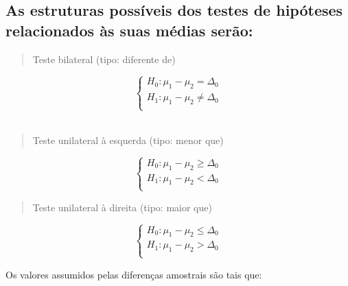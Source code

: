 \documentclass[
]{book}
\begin{document}
\hfill\break

\hypertarget{as-estruturas-possuxedveis-dos-testes-de-hipuxf3teses-relacionados-uxe0s-suas-muxe9dias-seruxe3o}{%
\subsection{As estruturas possíveis dos testes de hipóteses relacionados às suas médias serão:}\label{as-estruturas-possuxedveis-dos-testes-de-hipuxf3teses-relacionados-uxe0s-suas-muxe9dias-seruxe3o}}

\hfill\break

\begin{quote}
Teste bilateral (tipo: diferente de)
\end{quote}

\hfill\break

\[
\begin{cases}
    H_{0}:\mu_{1} - \mu_{2} = \Delta_{0} \\
    H_{1}:\mu_{1} - \mu_{2} \ne \Delta_{0} \\
\end{cases}
\]\\

\begin{quote}
Teste unilateral à esquerda (tipo: menor que)
\end{quote}

\hfill\break

\[
\begin{cases}
    H_{0}:\mu_{1} - \mu_{2} \ge \Delta_{0}\\
    H_{1}: \mu_{1} - \mu_{2} < \Delta_{0}\\
\end{cases}
\]

\hfill\break

\begin{quote}
Teste unilateral à direita (tipo: maior que)
\end{quote}

\hfill\break

\[
\begin{cases}
    H_{0}:\mu_{1} - \mu_{2} \le \Delta_{0}\\
    H_{1}: \mu_{1} - \mu_{2} > \Delta_{0}\\
\end{cases}
\]

\hfill\break

Os valores assumidos pelas diferenças amostrais são tais que:

\hfill\break
\end{document}

